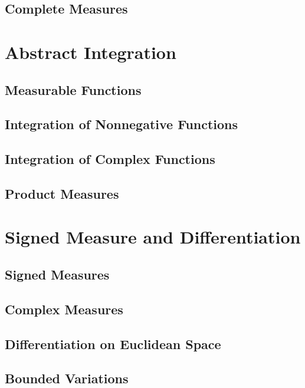 \section{Complete Measures}


\chapter{Abstract Integration}

\section{Measurable Functions}

\section{Integration of Nonnegative Functions}

\section{Integration of Complex Functions}

\section{Product Measures}


\chapter{Signed Measure and Differentiation}

\section{Signed Measures}

\section{Complex Measures}

\section{Differentiation on Euclidean Space}

\section{Bounded Variations}

